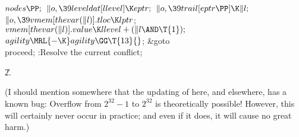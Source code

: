 ${}\\{nodes}\PP;{}$\6
${}\|o,\39\\{leveldat}[\\{llevel}]\K\\{eptr};{}$\6
${}\|o,\39\\{trail}[\\{eptr}\PP]\K\|l;{}$\6
${}\|o,\39\\{vmem}[\\{thevar}(\|l)].\\{tloc}\K\\{lptr}{}$;\6
${}\\{vmem}[\\{thevar}(\|l)].\\{value}\K\\{llevel}+(\|l\AND\T{1});{}$\6
${}\\{agility}\MRL{-{\K}}\\{agility}\GG\T{13}{}$;\6
\&{goto} \\{proceed};\6
:Resolve the current conflict\X;\par
\U2.\fi

(I should mention somewhere that the updating of  here,
and elsewhere, has a known bug: Overflow from $2^{32}-1$ to $2^{32}$
is theoretically possible! However, this will certainly never occur
in practice; and even if it does, it will cause no great harm.)

